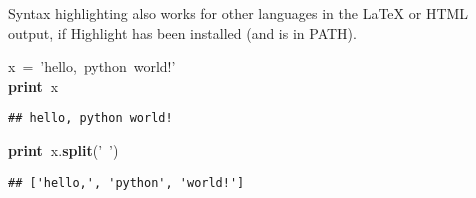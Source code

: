 \documentclass{article}\usepackage[]{graphicx}\usepackage[]{color}
\makeatletter
\newcommand{\hlstr}[1]{\textcolor[rgb]{0.192,0.494,0.8}{#1}}%
\newcommand{\hlopt}[1]{\textcolor[rgb]{0,0,0}{#1}}%
\newcommand{\hlstd}[1]{\textcolor[rgb]{0.345,0.345,0.345}{#1}}%
\newcommand{\hlkwa}[1]{\textcolor[rgb]{0.161,0.373,0.58}{\textbf{#1}}}%
\newcommand{\hlkwd}[1]{\textcolor[rgb]{0.737,0.353,0.396}{\textbf{#1}}}%
\newenvironment{kframe}{%
 \def\at@end@of@kframe{}%
 \ifinner\ifhmode%
  \def\at@end@of@kframe{\end{minipage}}%
  \begin{minipage}{\columnwidth}%
 \fi\fi%
 \def\FrameCommand##1{\hskip\@totalleftmargin \hskip-\fboxsep
 \colorbox{shadecolor}{##1}\hskip-\fboxsep
     \hskip-\linewidth \hskip-\@totalleftmargin \hskip\columnwidth}%
 \MakeFramed {\advance\hsize-\width
   \@totalleftmargin\z@ \linewidth\hsize
   \@setminipage}}%
 {\par\unskip\endMakeFramed%
 \at@end@of@kframe}
\newenvironment{knitrout}{}{} %
\makeatother
\begin{document}
Syntax highlighting also works for other languages in the \LaTeX{} or HTML output, if Highlight has been installed (and is in PATH).

\begin{knitrout}
\color{fgcolor}\begin{kframe}
\noindent
\ttfamily
\hlstd{x\ }\hlopt{=\ }\hlstd{}\hlstr{'hello,\ python\ world!'}\hlstd{}\hspace*{\fill}\\
\hlkwa{print\ }\hlstd{x}\hspace*{\fill}
\mbox{}
\normalfont
\begin{verbatim}
## hello, python world!
\end{verbatim}
\noindent
\ttfamily
\hlstd{}\hlkwa{print\ }\hlstd{x}\hlopt{.}\hlstd{}\hlkwd{split}\hlstd{}\hlopt{(}\hlstd{}\hlstr{'\ '}\hlstd{}\hlopt{)}\hlstd{}\hspace*{\fill}
\mbox{}
\normalfont
\begin{verbatim}
## ['hello,', 'python', 'world!']
\end{verbatim}
\end{kframe}
\end{knitrout}
\end{document}
